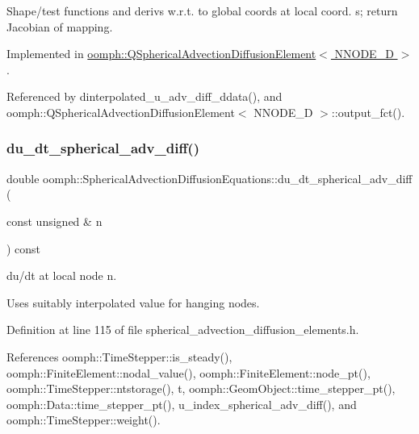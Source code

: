 Shape/test functions and derivs w.\+r.\+t. to global coords at local coord. s; return Jacobian of mapping. 



Implemented in \hyperlink{classoomph_1_1QSphericalAdvectionDiffusionElement_a75d5e8f33411030e31e82da809d946d2}{oomph\+::\+Q\+Spherical\+Advection\+Diffusion\+Element$<$ N\+N\+O\+D\+E\+\_\+D $>$}.



Referenced by dinterpolated\+\_\+u\+\_\+adv\+\_\+diff\+\_\+ddata(), and oomph\+::\+Q\+Spherical\+Advection\+Diffusion\+Element$<$ N\+N\+O\+D\+E\+\_\+D $>$\+::output\+\_\+fct().

\mbox{\label{classoomph_1_1SphericalAdvectionDiffusionEquations_a5159b68db86351eba5efa89f4c922745}} 
\subsubsection{\texorpdfstring{du\+\_\+dt\+\_\+spherical\+\_\+adv\+\_\+diff()}{du\_dt\_spherical\_adv\_diff()}}
{\footnotesize\ttfamily double oomph\+::\+Spherical\+Advection\+Diffusion\+Equations\+::du\+\_\+dt\+\_\+spherical\+\_\+adv\+\_\+diff (\begin{DoxyParamCaption}\item[{const unsigned \&}]{n }\end{DoxyParamCaption}) const\hspace{0.3cm}{\ttfamily [inline]}}



du/dt at local node n. 

Uses suitably interpolated value for hanging nodes. 

Definition at line 115 of file spherical\+\_\+advection\+\_\+diffusion\+\_\+elements.\+h.



References oomph\+::\+Time\+Stepper\+::is\+\_\+steady(), oomph\+::\+Finite\+Element\+::nodal\+\_\+value(), oomph\+::\+Finite\+Element\+::node\+\_\+pt(), oomph\+::\+Time\+Stepper\+::ntstorage(), t, oomph\+::\+Geom\+Object\+::time\+\_\+stepper\+\_\+pt(), oomph\+::\+Data\+::time\+\_\+stepper\+\_\+pt(), u\+\_\+index\+\_\+spherical\+\_\+adv\+\_\+diff(), and oomph\+::\+Time\+Stepper\+::weight().



